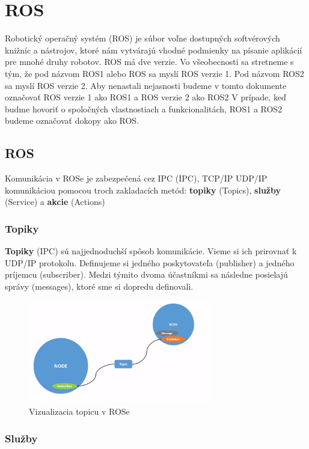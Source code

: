 \section{ROS}
\noindent Robotický operačný systém (\acrlong{ROS}) je súbor voľne dostupných softvérových knižníc a nástrojov, ktoré nám vytvárajú
vhodné podmienky na písanie aplikácií pre mnohé druhy robotov. ROS má dve verzie. Vo všeobecnosti sa stretneme s tým, že pod názvom
ROS1 alebo ROS sa myslí ROS verzie 1. Pod názvom ROS2 sa myslí ROS verzie 2. Aby nenastali nejasnosti budeme v tomto dokumente
označovať ROS verzie 1 ako ROS1 a ROS verzie 2 ako ROS2 V prípade, keď budme hovoriť o spoločných vlastnostiach a funkcionalitách,
ROS1 a ROS2 budeme označovať dokopy ako ROS.

\subsection{ROS}

\noindent Komunikácia v ROSe je zabezpečená cez IPC (\acrlong{IPC}), TCP/IP UDP/IP komunikáciou pomocou troch zakladacích metód:
\textbf{topiky} (Topics), \textbf{služby} (Service) a \textbf{akcie} (Actions)

\subsubsection{Topiky}

\textbf {Topiky} (IPC) sú najjednoduchší spôsob komunikácie. Vieme si ich prirovnať k UDP/IP protokolu. Definujeme si jedného poskytovateľa (publisher)
a jedného príjemcu (subscriber). Medzi týmito dvoma účastníkmi sa následne posielajú správy (messages), ktoré sme si dopredu definovali.

\begin{figure}[h]
	\centering
	\includegraphics[width=8cm]{img/topicsExplanation.png}
	\caption{Vizualizacia topicu v ROSe \cite{RosDoc}}
	\label{fig:topics}
\end{figure}

\subsubsection{Služby}

